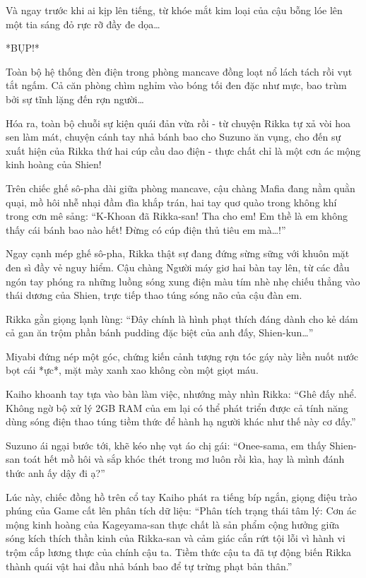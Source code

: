 \documentclass[../main.tex]{subfiles}
\begin{document}
Và ngay trước khi ai kịp lên tiếng, từ khóe mắt kim loại của cậu bỗng lóe lên một tia sáng đỏ rực rỡ đầy đe dọa\dots

*BỤP!*

Toàn bộ hệ thống đèn điện trong phòng mancave đồng loạt nổ lách tách rồi vụt tắt ngấm. Cả căn phòng chìm nghỉm vào bóng tối đen đặc như mực, bao trùm bởi sự tĩnh lặng đến rợn người\dots

\omk

Hóa ra, toàn bộ chuỗi sự kiện quái đản vừa rồi - từ chuyện Rikka tự xả vòi hoa sen làm mát, chuyện cánh tay nhả bánh bao cho Suzuno ăn vụng, cho đến sự xuất hiện của Rikka thứ hai cúp cầu dao điện - thực chất chỉ là một cơn ác mộng kinh hoàng của Shien!

Trên chiếc ghế sô-pha dài giữa phòng mancave, cậu chàng Mafia đang nằm quằn quại, mồ hôi nhễ nhại đầm đìa khắp trán, hai tay quơ quào trong không khí trong cơn mê sảng: ``K-Khoan đã Rikka-san! Tha cho em! Em thề là em không thấy cái bánh bao nào hết! Đừng có cúp điện thủ tiêu em mà\dots!''

Ngay cạnh mép ghế sô-pha, Rikka thật sự đang đứng sừng sững với khuôn mặt đen sì đầy vẻ nguy hiểm. Cậu chàng Người máy giơ hai bàn tay lên, từ các đầu ngón tay phóng ra những luồng sóng xung điện màu tím nhè nhẹ chiếu thẳng vào thái dương của Shien, trực tiếp thao túng sóng não của cậu đàn em.


Rikka gằn giọng lạnh lùng: ``Đây chính là hình phạt thích đáng dành cho kẻ dám cả gan ăn trộm phần bánh pudding đặc biệt của anh đấy, Shien-kun\dots''

Miyabi đứng nép một góc, chứng kiến cảnh tượng rợn tóc gáy này liền nuốt nước bọt cái *ực*, mặt mày xanh xao không còn một giọt máu.

Kaiho khoanh tay tựa vào bàn làm việc, nhướng mày nhìn Rikka: ``Ghê đấy nhể. Không ngờ bộ xử lý 2GB RAM của em lại có thể phát triển được cả tính năng dùng sóng điện thao túng tiềm thức để hành hạ người khác như thế này cơ đấy.''

Suzuno ái ngại bước tới, khẽ kéo nhẹ vạt áo chị gái: ``Onee-sama, em thấy Shien-san toát hết mồ hôi và sắp khóc thét trong mơ luôn rồi kìa, hay là mình đánh thức anh ấy dậy đi ạ?''

Lúc này, chiếc đồng hồ trên cổ tay Kaiho phát ra tiếng bíp ngắn, giọng điệu trào phúng của Game cất lên phân tích dữ liệu: ``Phân tích trạng thái tâm lý: Cơn ác mộng kinh hoàng của Kageyama-san thực chất là sản phẩm cộng hưởng giữa sóng kích thích thần kinh của Rikka-san và cảm giác cắn rứt tội lỗi vì hành vi trộm cắp lương thực của chính cậu ta. Tiềm thức cậu ta đã tự động biến Rikka thành quái vật hai đầu nhả bánh bao để tự trừng phạt bản thân.''
\end{document}
